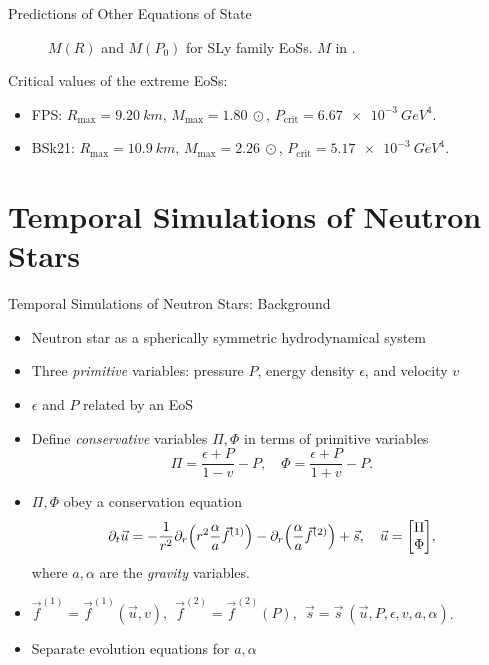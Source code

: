 \documentclass[handout]{beamer}
\newcommand{\p}{\partial}
\begin{document}
\begin{frame}{Predictions of Other Equations of State}
\begin{figure}[h!]
\begin{subfigure}{.5\textwidth}
            \end{subfigure}
            \caption[]{$M(R)$ and $M(P_0)$ for SLy family EoSs. $M$ in \SI{}{\odot}.}
        \end{figure} \pause
        \vspace{-10pt}
        Critical values of the extreme EoSs: \pause
        \begin{itemize}
            \item FPS: $R_\text{max} = \SI{9.20}{km}$, $M_\text{max} = \SI{1.80}{\odot}$, $P_\text{crit} = \SI{6.67e-3}{GeV^4}.$
            \item BSk21: $R_\text{max} = \SI{10.9}{km}$, $M_\text{max} = \SI{2.26}{\odot}$, $P_\text{crit} = \SI{5.17e-3}{GeV^4}.$
        \end{itemize}

    \end{frame}

    \section{Temporal Simulations of Neutron Stars}

    \begin{frame}{Temporal Simulations of Neutron Stars: Background}
        \begin{itemize}
            \pause
            \item Neutron star as a spherically symmetric hydrodynamical system \pause
            \item Three \textit{primitive} variables: pressure $P$, energy density $\epsilon$, and velocity $v$ \pause
            \item $\epsilon$ and $P$ related by an EoS \pause
            \item Define \textit{conservative} variables $\Pi, \Phi$ in terms of primitive variables
            \[\Pi = \frac{\epsilon + P}{1-v} - P, \quad \Phi = \frac{\epsilon + P}{1+v} - P.\] \pause
            \vspace{-15pt}
            \item $\Pi, \Phi$ obey a conservation equation
            \[\p_t \vec{u} = -\frac{1}{r^2}\p_r\pqty{r^2\frac{\alpha}{a}\vec{f}^{(1)}} - \p_r\qty(\frac{\alpha}{a}\vec{f}^{(2)})+\vec{s}, \quad \vec{u} = \mqty[\Pi\\\Phi],\]
            where $a,\alpha$ are the \textit{gravity} variables. \pause
            \item $\vec{f}^{(1)} = \vec{f}^{(1)} (\vec{u}, v),~~ \vec{f}^{(2)} = \vec{f}^{(2)}(P),~~ \vec{s} = \vec{s}~(\vec{u},P,\epsilon,v,a,\alpha)$. \pause
            \item Separate evolution equations for $a,\alpha$
        \end{itemize}
    \end{frame}
\end{document}
